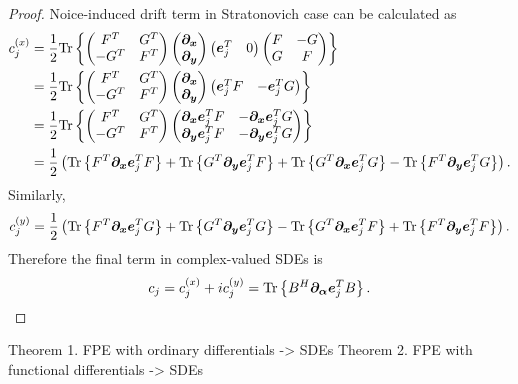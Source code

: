 \begin{proof}
Noice-induced drift term in Stratonovich case can be calculated as
\begin{equation*}
\begin{split}
	c_j^{(x)}
	& = \frac{1}{2} \mathrm{Tr} \left\{ 
		\begin{pmatrix}
			F^T & G^T \\ -G^T & F^T
		\end{pmatrix}
		\begin{pmatrix}
			\bm{\partial}_{\bm{x}} \\
			\bm{\partial}_{\bm{y}}
		\end{pmatrix}
		\begin{pmatrix}
			\bm{e}_j^T & 0
		\end{pmatrix}
		\begin{pmatrix}
			F & -G \\ G & F
		\end{pmatrix}
	 \right\} \\
	& = \frac{1}{2} \mathrm{Tr} \left\{ 
		\begin{pmatrix}
			F^T & G^T \\ -G^T & F^T
		\end{pmatrix}
		\begin{pmatrix}
			\bm{\partial}_{\bm{x}} \\
			\bm{\partial}_{\bm{y}}
		\end{pmatrix}
		\begin{pmatrix}
			\bm{e}_j^T F & - \bm{e}_j^T G
		\end{pmatrix}
	 \right\} \\
	& = \frac{1}{2} \mathrm{Tr} \left\{ 
		\begin{pmatrix}
			F^T & G^T \\ -G^T & F^T
		\end{pmatrix}
		\begin{pmatrix}
			\bm{\partial}_{\bm{x}} \bm{e}_j^T F & - \bm{\partial}_{\bm{x}} \bm{e}_j^T G \\
			\bm{\partial}_{\bm{y}} \bm{e}_j^T F & - \bm{\partial}_{\bm{y}} \bm{e}_j^T G
		\end{pmatrix}
	 \right\} \\
	& = \frac{1}{2} \left(
		\mathrm{Tr} \left\{  F^T \bm{\partial}_{\bm{x}} \bm{e}_j^T F  \right\}
		+ \mathrm{Tr} \left\{  G^T \bm{\partial}_{\bm{y}} \bm{e}_j^T F  \right\}
		+ \mathrm{Tr} \left\{  G^T \bm{\partial}_{\bm{x}} \bm{e}_j^T G  \right\}
		- \mathrm{Tr} \left\{  F^T \bm{\partial}_{\bm{y}} \bm{e}_j^T G  \right\}
	\right).
\end{split}
\end{equation*}
Similarly,
\[
	c_j^{(y)}
	= \frac{1}{2} \left(
		\mathrm{Tr} \left\{  F^T \bm{\partial}_{\bm{x}} \bm{e}_j^T G  \right\}
		+ \mathrm{Tr} \left\{  G^T \bm{\partial}_{\bm{y}} \bm{e}_j^T G  \right\}
		- \mathrm{Tr} \left\{  G^T \bm{\partial}_{\bm{x}} \bm{e}_j^T F  \right\}
		+ \mathrm{Tr} \left\{  F^T \bm{\partial}_{\bm{y}} \bm{e}_j^T F  \right\}
	\right).
\]
Therefore the final term in complex-valued SDEs is
\[
	c_j
	= c_j^{(x)} + i c_j^{(y)}
	= \mathrm{Tr} \left\{  B^H \bm{\partial}_{\bm{\alpha}} \bm{e}_j^T B  \right\}.
	\qedhere
\]
\end{proof}

Theorem 1. FPE with ordinary differentials -> SDEs
Theorem 2. FPE with functional differentials -> SDEs
